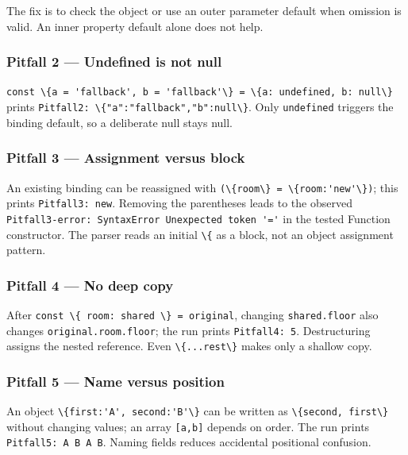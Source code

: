 \documentclass[
  10pt,
]{article}
\newcommand{\passthrough}[1]{#1}
\begin{document}
The fix is to check the object or use an outer parameter default when
omission is valid. An inner property default alone does not help.

\subsubsection{Pitfall 2 --- Undefined is not
null}\label{pitfall-2-undefined-is-not-null}

\passthrough{\lstinline!const \{a = 'fallback', b = 'fallback'\} = \{a: undefined, b: null\}!}
prints \passthrough{\lstinline!Pitfall2: \{"a":"fallback","b":null\}!}.
Only \passthrough{\lstinline!undefined!} triggers the binding default,
so a deliberate null stays null.

\subsubsection{Pitfall 3 --- Assignment versus
block}\label{pitfall-3-assignment-versus-block}

An existing binding can be reassigned with
\passthrough{\lstinline!(\{room\} = \{room:'new'\})!}; this prints
\passthrough{\lstinline!Pitfall3: new!}. Removing the parentheses leads
to the observed
\passthrough{\lstinline!Pitfall3-error: SyntaxError Unexpected token '='!}
in the tested Function constructor. The parser reads an initial
\passthrough{\lstinline!\{!} as a block, not an object assignment
pattern.

\subsubsection{Pitfall 4 --- No deep copy}\label{pitfall-4-no-deep-copy}

After \passthrough{\lstinline!const \{ room: shared \} = original!},
changing \passthrough{\lstinline!shared.floor!} also changes
\passthrough{\lstinline!original.room.floor!}; the run prints
\passthrough{\lstinline!Pitfall4: 5!}. Destructuring assigns the nested
reference. Even \passthrough{\lstinline!\{...rest\}!} makes only a
shallow copy.

\subsubsection{Pitfall 5 --- Name versus
position}\label{pitfall-5-name-versus-position}

An object \passthrough{\lstinline!\{first:'A', second:'B'\}!} can be
written as \passthrough{\lstinline!\{second, first\}!} without changing
values; an array \passthrough{\lstinline![a,b]!} depends on order. The
run prints \passthrough{\lstinline!Pitfall5: A B A B!}. Naming fields
reduces accidental positional confusion.
\end{document}
